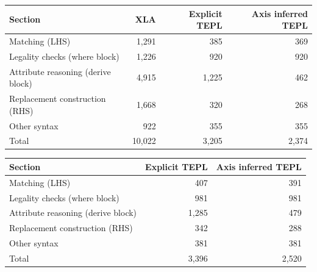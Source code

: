 \begin{tabular}{lrrr}
\toprule
Section & XLA & Explicit TEPL & Axis inferred TEPL \\
\midrule
Matching (LHS) & 1,291 & 385 & 369 \\
Legality checks (where block) & 1,226 & 920 & 920 \\
Attribute reasoning (derive block) & 4,915 & 1,225 & 462 \\
Replacement construction (RHS) & 1,668 & 320 & 268 \\
Other syntax & 922 & 355 & 355 \\
\midrule
Total & 10,022 & 3,205 & 2,374 \\
\bottomrule
\end{tabular}

\begin{tabular}{lrr}
\toprule
Section & Explicit TEPL & Axis inferred TEPL \\
\midrule
Matching (LHS) & 407 & 391 \\
Legality checks (where block) & 981 & 981 \\
Attribute reasoning (derive block) & 1,285 & 479 \\
Replacement construction (RHS) & 342 & 288 \\
Other syntax & 381 & 381 \\
\midrule
Total & 3,396 & 2,520 \\
\bottomrule
\end{tabular}
